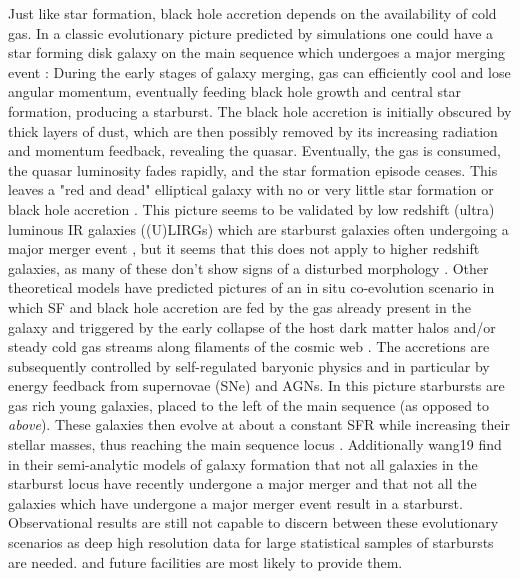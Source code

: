    Just like star formation, black hole accretion depends on the availability of cold gas. 
    In a classic evolutionary picture predicted by simulations one could have a star forming disk galaxy on the main sequence which undergoes a major merging event \citep{2005Natur.433..604D, 2008ApJS..175..356H}: During the early stages of galaxy merging, gas can efficiently cool and lose angular momentum, eventually feeding black hole growth and central star formation, producing a starburst. The black hole accretion is initially obscured by thick layers of dust, which are then possibly removed by its increasing radiation and momentum feedback, revealing the quasar. Eventually, the gas is consumed, the quasar luminosity fades rapidly, and the star formation episode ceases. This leaves a "red and dead" elliptical galaxy with no or very little star formation or black hole accretion \citep{2004ApJ...600..580G, 2006ApJ...650...42L}. This picture seems to be validated by low redshift (ultra) luminous IR galaxies ((U)LIRGs) which are starburst galaxies often undergoing a major merger event \citep{1996ARA&A..34..749S}, but it seems that this does not apply to higher redshift galaxies, as many of these don't show signs of a disturbed morphology \citep{2007A&A...468...33E, 2019ApJ...877L..38R}. 
    Other theoretical models have predicted pictures of an in situ co-evolution scenario in which SF and black hole accretion are fed by the gas already present in the galaxy and triggered by the early collapse of the host dark matter halos  \citep[e.g.][]{2006ApJ...650...42L, 2011ApJ...742...24L, 2014ApJ...782...69L, 2013ApJ...772..119L,2015ApJ...810...74A, 2016ApJ...833..152M} and/or steady cold gas streams along filaments of the cosmic web  \citep[e.g.][]{2009Natur.457..451D, 2011ApJ...741L..33B}. The accretions are subsequently controlled by self-regulated baryonic physics and in particular by energy feedback from supernovae (SNe) and AGNs. In this picture starbursts are gas rich young galaxies, placed to the left of the main sequence (as opposed to \textit{above}). These galaxies then evolve at about a constant SFR while increasing their stellar masses, thus reaching the main sequence locus \citep{2016ApJ...833..152M, 2018ApJ...857...22L}. Additionally wang19 \citet{2019MNRAS.482.4454W} find in their semi-analytic models of galaxy formation that not all galaxies in the starburst locus have recently undergone a major merger and that not all the galaxies which have undergone a major merger event result in a starburst.
    Observational results are still not capable to discern between these evolutionary scenarios as deep high resolution data for large statistical samples of starbursts are needed. and future facilities are most likely to provide them. %
    
